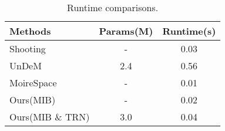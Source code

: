 \begin{table}[t]
\centering
\setlength{\tabcolsep}{3.5mm}
\begin{tabular}{lcc}
\toprule
Methods          & Params(M) & Runtime(s) \\
\midrule
Shooting         & -         & 0.03       \\
UnDeM            & 2.4       & 0.56       \\
MoireSpace       & -         & 0.01       \\
Ours(MIB)        & -         & 0.02       \\
Ours(MIB \& TRN) & 3.0       & 0.04       \\ \bottomrule
\end{tabular}
\caption{Runtime comparisons.}
\label{tab:Runtime}
\end{table}



